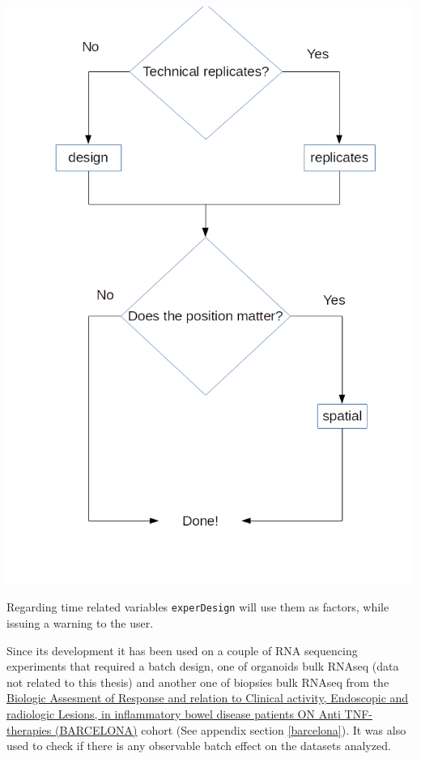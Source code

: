 \documentclass[
  12pt,
  a4paper,
  twoside,
  openright]{book}
\let\origfigure\figure
\let\endorigfigure\endfigure
\renewenvironment{figure}[1][2] {
    \expandafter\origfigure\expandafter[!htbp]
} {
    \endorigfigure
}
\begin{document}
\begin{figure}
\includegraphics[width=1\linewidth]{images/experDesign-flowchart} \caption[experDesign functions and workflow]{`experDesign` functions and workflow. Workflow for users of the package showing which functions can be used depending on the experiment design they have.}\label{fig:experdesign-flowchart}
\end{figure}

Regarding time related variables \texttt{experDesign} will use them as factors, while issuing a warning to the user.

Since its development it has been used on a couple of RNA sequencing experiments that required a batch design, one of organoids bulk RNAseq (data not related to this thesis) and another one of biopsies bulk RNAseq from the \protect\hyperlink{acronyms_BARCELONA}{Biologic Assesment of Response and relation to Clinical activity, Endoscopic and radiologic Lesions, in inflammatory bowel disease patients ON Anti TNF-therapies (BARCELONA)} cohort (See appendix section \ref{barcelona}).
It was also used to check if there is any observable batch effect on the datasets analyzed.
\end{document}
